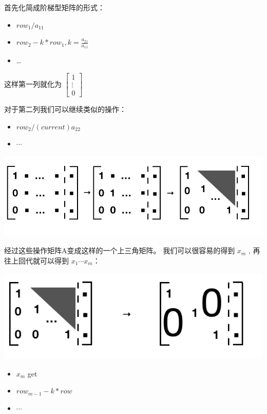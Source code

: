 \documentclass[
]{book}
\providecommand{\tightlist}{%
  \setlength{\itemsep}{0pt}\setlength{\parskip}{0pt}}
\begin{document}
首先化简成阶梯型矩阵的形式：

\begin{itemize}
\tightlist
\item
  \(row_1 / a_{11}\)
\item
  \(row_2 - k * row_1, k = \frac{a_{21}}{a_{11}}\)
\item
  \ldots{}
\end{itemize}

这样第一列就化为 \(\begin{bmatrix} 1 \\ \vdots \\ 0 \end{bmatrix}\)

对于第二列我们可以继续类似的操作：

\begin{itemize}
\tightlist
\item
  \(row_2 / (current)a_{22}\)
\item
  \(\cdots\)
\end{itemize}

\includegraphics{images/Gauss_01_PLU_U.png}

经过这些操作矩阵A变成这样的一个上三角矩阵。 我们可以很容易的得到 \(x_m\) , 再往上回代就可以得到 \(x_1 \cdots x_m\)：

\includegraphics{images/Gauss_02_PLU_I.png}

\begin{itemize}
\tightlist
\item
  \(x_m\) get
\item
  \(row_{m-1} - k * row\)
\item
  \(\cdots\)
\end{itemize}
\end{document}
